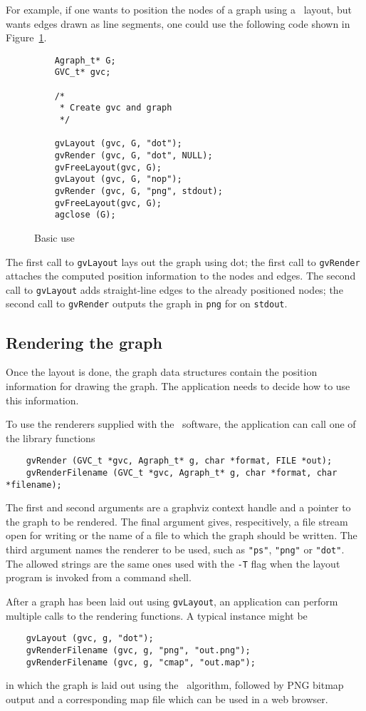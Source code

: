 For example, if one wants to position the nodes of a graph using
a \dot\ layout, but wants edges drawn as line segments, one could
use the following code shown in Figure~\ref{fig:nop}.
\begin{figure}[hbt]
\begin{verbatim}
    Agraph_t* G;
    GVC_t* gvc;

    /* 
     * Create gvc and graph 
     */

    gvLayout (gvc, G, "dot");
    gvRender (gvc, G, "dot", NULL);
    gvFreeLayout(gvc, G);
    gvLayout (gvc, G, "nop");
    gvRender (gvc, G, "png", stdout);
    gvFreeLayout(gvc, G);
    agclose (G);
\end{verbatim}
\caption{Basic use}
\label{fig:nop}
\end{figure}
The first call to {\tt gvLayout} lays out the graph using dot;
the first call to {\tt gvRender} attaches the computed position
information to the nodes and edges. 
The second call to {\tt gvLayout} adds straight-line edges to the
already positioned nodes; the second call to {\tt gvRender} outputs
the graph in {\tt png} for on {\tt stdout}.

\subsection{Rendering the graph}
\label{sec:layout_info}
Once the layout is done, the graph data structures contain
the position information for drawing the graph. 
The application needs to decide how to use this information.

To use the renderers supplied with the \gviz\ software, the application
can call one of the library functions 
\begin{verbatim}
    gvRender (GVC_t *gvc, Agraph_t* g, char *format, FILE *out);
    gvRenderFilename (GVC_t *gvc, Agraph_t* g, char *format, char *filename);
\end{verbatim}
The first and second arguments are a graphviz context handle and a pointer
to the graph to be rendered. The final argument gives, respecitively,
a file stream open for writing or the name of a file to which the
graph should be written. The third argument names the renderer to
be used, such as {\tt "ps"}, {\tt "png"} or {\tt "dot"}.
The allowed strings are the same ones used with the {\tt -T} flag
when the layout program is invoked from a command shell.

After a graph has been laid out using {\tt gvLayout}, an application
can perform multiple calls to the rendering functions. A typical instance
might be  
\begin{verbatim}
    gvLayout (gvc, g, "dot");
    gvRenderFilename (gvc, g, "png", "out.png");
    gvRenderFilename (gvc, g, "cmap", "out.map");
\end{verbatim}
in which the graph is laid out using the \dot\ algorithm, followed by
PNG bitmap output and a corresponding map file which can be used in a web
browser.


